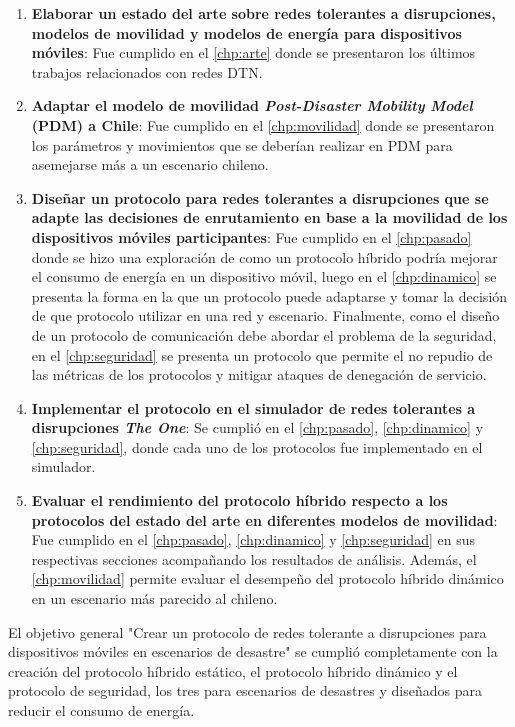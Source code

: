 \begin{enumerate}
    \item \textbf{Elaborar un estado del arte sobre redes tolerantes a disrupciones,
      modelos de movilidad y modelos de energía para dispositivos móviles}: Fue
      cumplido en el \ref{chp:arte} donde se presentaron los últimos trabajos
      relacionados con redes DTN.
    \item \textbf{Adaptar el modelo de movilidad \textit{Post-Disaster Mobility
    Model} (PDM) \cite{uddin_post-disaster_2009}  a Chile}: Fue cumplido en el
    \ref{chp:movilidad} donde se presentaron los parámetros y movimientos que se
    deberían realizar en PDM para asemejarse más a un escenario chileno.
    \item \textbf{Diseñar un protocolo para redes tolerantes a
      disrupciones que se adapte las decisiones de enrutamiento en base a la
      movilidad de los dispositivos móviles participantes}: Fue cumplido en el
      \ref{chp:pasado} donde se hizo una exploración de como un protocolo
      híbrido podría mejorar el consumo de energía en un dispositivo móvil,
      luego en el \ref{chp:dinamico} se presenta la forma en la que un protocolo
      puede adaptarse y tomar la decisión de que protocolo utilizar en una red
      y escenario. Finalmente, como el diseño de un protocolo de comunicación debe
      abordar el problema de la seguridad, en el \ref{chp:seguridad} se presenta
      un protocolo que permite el no repudio de las métricas de los protocolos y
      mitigar ataques de denegación de servicio.
    \item \textbf{Implementar el protocolo en el simulador de redes tolerantes a
      disrupciones \textit{The One}}: Se cumplió en el \ref{chp:pasado},
      \ref{chp:dinamico} y \ref{chp:seguridad}, donde cada uno de los protocolos
      fue implementado en el simulador.
    \item \textbf{Evaluar el rendimiento del protocolo híbrido respecto a los protocolos
      del estado del arte en diferentes modelos de movilidad}: Fue cumplido en el
      \ref{chp:pasado}, \ref{chp:dinamico} y \ref{chp:seguridad} en sus
      respectivas secciones acompañando los resultados de análisis. Además, el
      \ref{chp:movilidad} permite evaluar el desempeño del protocolo híbrido
      dinámico en un escenario más parecido al chileno.
\end{enumerate}


El objetivo general "Crear un protocolo de redes tolerante a disrupciones  para
dispositivos móviles en escenarios de desastre" se cumplió completamente con la
creación del protocolo híbrido estático, el protocolo híbrido dinámico y el
protocolo de seguridad, los tres para escenarios de desastres y diseñados para
reducir el consumo de energía.


